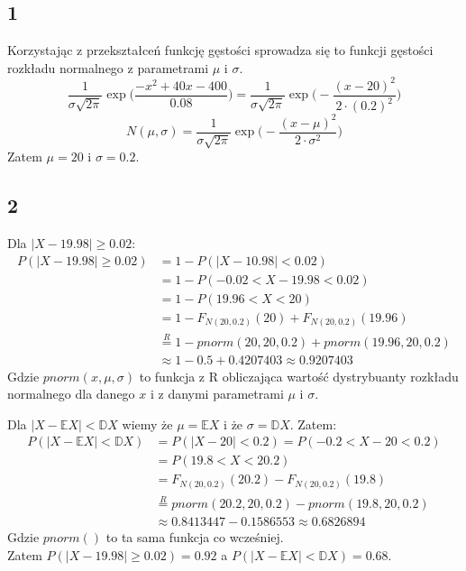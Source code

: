 \documentclass{article}
\begin{document}
\subsection*{1}
Korzystając z przekształceń funkcję gęstości sprowadza się to funkcji gęstości rozkładu normalnego z parametrami $\mu$ i $\sigma$.
$$\frac{1}{\sigma\sqrt{2\pi}}\exp\Big(\frac{-x^2+40x-400}{0.08}\Big) = \frac{1}{\sigma\sqrt{2\pi}}\exp\Big(-\frac{(x-20)^2}{2\cdot(0.2)^2}\Big)$$
$$N(\mu,\sigma) = \frac{1}{\sigma\sqrt{2\pi}}\exp\Big(-\frac{(x-\mu)^2}{2\cdot\sigma^2}\Big)$$
Zatem $\mu = 20$ i $\sigma = 0.2$.

\subsection*{2}
Dla $|X-19.98|\geq 0.02$:
\begin{align*}
P(|X-19.98|\geq0.02) & = 1 - P(|X-10.98|<0.02) \\
& = 1 - P(-0.02<X-19.98<0.02) \\
& = 1 - P(19.96<X<20) \\
& = 1 - F_{N(20,0.2)}(20) + F_{N(20,0.2)}(19.96) \\
& \overset{R}{=} 1 - pnorm(20,20,0.2) + pnorm(19.96,20,0.2) \\
& \approx 1 - 0.5 + 0.4207403 \approx 0.9207403
\end{align*}
Gdzie $pnorm(x,\mu,\sigma)$ to funkcja z R obliczająca wartość dystrybuanty rozkładu normalnego dla danego $x$ i z danymi parametrami $\mu$ i $\sigma$.
\\
\par
Dla $|X-\mathbb{E}X|<\mathbb{D}X$ wiemy że $\mu = \mathbb{E}X$ i że $\sigma = \mathbb{D}X$. Zatem:
\begin{align*}
P(|X-\mathbb{E}X|<\mathbb{D}X) & = P(|X-20|<0.2) = P(-0.2<X-20<0.2) \\
& = P(19.8<X<20.2) \\
& = F_{N(20,0.2)}(20.2) - F_{N(20,0.2)}(19.8) \\
& \overset{R}{=} pnorm(20.2,20,0.2) - pnorm(19.8,20,0.2) \\
& \approx 0.8413447 - 0.1586553 \approx 0.6826894
\end{align*}
Gdzie $pnorm()$ to ta sama funkcja co wcześniej. \\
Zatem $P(|X-19.98|\geq0.02) = 0.92$ a $P(|X-\mathbb{E}X|<\mathbb{D}X) = 0.68$.
\end{document}
